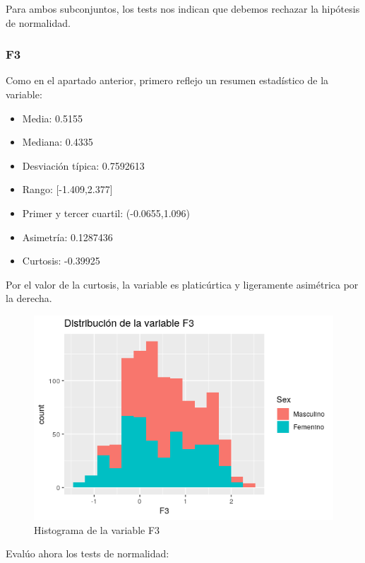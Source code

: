 Para ambos subconjuntos, los tests nos indican que debemos rechazar la hipótesis de normalidad.

\subsubsection{F3}

Como en el apartado anterior, primero reflejo un resumen estadístico de la variable:

\begin{itemize}
	\item Media: 0.5155
	\item Mediana: 0.4335
	\item Desviación típica: 0.7592613
	\item Rango: [-1.409,2.377]
	\item Primer y tercer cuartil: (-0.0655,1.096)
	\item Asimetría: 0.1287436
	\item Curtosis: -0.39925
\end{itemize}

Por el valor de la curtosis, la variable es platicúrtica y ligeramente asimétrica por la derecha.

\begin{figure}[H] %
	\centering
	\includegraphics[scale=0.6]{dist-F3.png}  %
	\caption{Histograma de la variable F3} 
	\label{fig:hist-F3}
\end{figure}

Evalúo ahora los tests de normalidad:

